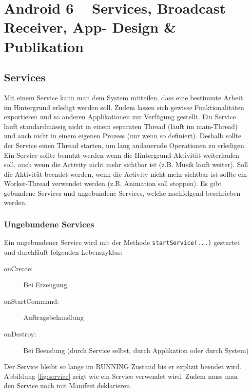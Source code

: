 \chapter{Android 6 – Services, Broadcast Receiver, App- Design \& Publikation}

\section{Services}

Mit einem Service kann man dem System mitteilen, dass eine bestimmte Arbeit im Hintergrund erledigt werden soll. Zudem lassen sich gewisse Funktionalitäten exportieren und so anderen Applikationen zur Verfügung gestellt. Ein Service läuft standardmässig nicht in einem separaten Thread (läuft im main-Thread) und auch nicht in einem eigenen Prozess (nur wenn so definiert). Deshalb sollte der Service einen Thread starten, um lang andauernde Operationen zu erledigen. Ein Service sollte benutzt werden wenn die Hintergrund-Aktivität weiterlaufen soll, auch wenn die Activity nicht mehr sichtbar ist (z.B. Musik läuft weiter). Soll die Aktivität beendet werden, wenn die Activity nicht mehr sichtbar ist sollte ein Worker-Thread verwendet werden (z.B. Animation soll stoppen). Es gibt gebundene Services und ungebundene Services, welche nachfolgend beschrieben werden.

\subsection{Ungebundene Services}

Ein ungebundener Service wird mit der Methode \texttt{startService(...)} gestartet und durchläuft folgenden Lebenszyklus:
\begin{description}
	\item[onCreate:] Bei Erzeugung
	\item[onStartCommand:] Auftragsbehandlung
	\item[onDestroy:] Bei Beendung (durch Service selbst, durch Applikation oder durch System)
\end{description}
Der Service bleibt so lange im RUNNING Zustand bis er explizit beendet wird. Abbildung \ref{fig:service} zeigt wie ein Service verwendet wird. Zudem muss man den Service noch mit Manifest deklarieren. 

